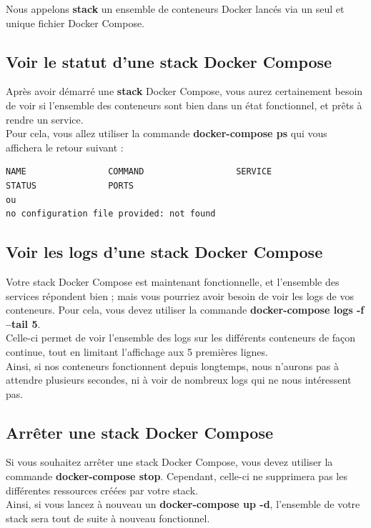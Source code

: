 \documentclass[12pt,a4paper]{article}
\begin{document}
Nous appelons \textbf{stack} un ensemble de conteneurs Docker lancés via un seul et unique fichier Docker Compose.\\

\subsection{Voir le statut d'une stack Docker Compose}
Après avoir démarré une \textbf{stack} Docker Compose, vous aurez certainement besoin de voir si l'ensemble des conteneurs sont bien dans un état fonctionnel, et prêts à rendre un service.\\
Pour cela, vous allez utiliser la commande \textbf{docker-compose ps} qui vous affichera le retour suivant :

\begin{verbatim}
NAME                COMMAND                  SERVICE             STATUS              PORTS
ou
no configuration file provided: not found  
\end{verbatim}

\subsection{Voir les logs d'une stack Docker Compose}
Votre stack Docker Compose est maintenant fonctionnelle, et l'ensemble des services répondent bien ; mais vous pourriez avoir besoin de voir les logs de vos conteneurs. Pour cela, vous devez utiliser la commande \textbf{docker-compose logs -f --tail 5}.\\

Celle-ci permet de voir l'ensemble des logs sur les différents conteneurs de façon continue, tout en limitant l'affichage aux 5 premières lignes.\\

Ainsi, si nos conteneurs fonctionnent depuis longtemps, nous n'aurons pas à attendre plusieurs secondes, ni à voir de nombreux logs qui ne nous intéressent pas.\\

\subsection{Arrêter une stack Docker Compose}
Si vous souhaitez arrêter une stack Docker Compose, vous devez utiliser la commande \textbf{docker-compose stop}. Cependant, celle-ci ne supprimera pas les différentes ressources créées par votre stack.\\
Ainsi, si vous lancez à nouveau un \textbf{docker-compose up -d}, l'ensemble de votre stack sera tout de suite à nouveau fonctionnel.\\
\end{document}
